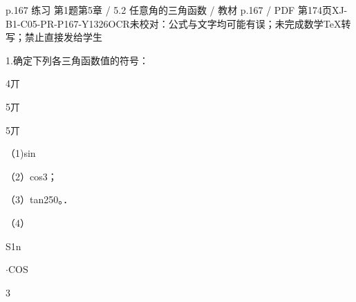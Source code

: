 \begin{bankitem}{p.167 练习 第1题}{第5章 / 5.2 任意角的三角函数 / 教材 p.167 / PDF 第174页}{XJ-B1-C05-PR-P167-Y1326}{OCR未校对：公式与文字均可能有误；未完成数学TeX转写；禁止直接发给学生}
\begin{ocrdraft}
\par
1.确定下列各三角函数值的符号：
\par
4丌
\par
5丌
\par
5丌
\par
（1)sin
\par
（2）cos3；
\par
（3）tan250。．
\par
（4）
\par
S1n
\par
\ensuremath{\cdot}COS
\par
3
\end{ocrdraft}
\end{bankitem}
